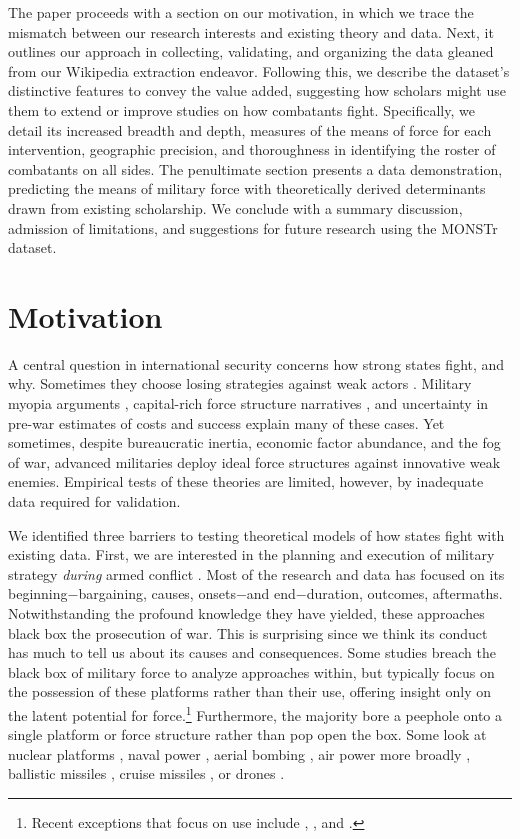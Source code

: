 \documentclass[fleqn,12pt]{article}
\begin{document}
The paper proceeds with a section on our motivation, in which we trace the mismatch between our research interests and existing theory and data. Next, it outlines our approach in collecting, validating, and organizing the data gleaned from our Wikipedia extraction endeavor. Following this, we describe the dataset's distinctive features to convey the value added, suggesting how scholars might use them to extend or improve studies on how combatants fight. Specifically, we detail its increased breadth and depth, measures of the means of force for each intervention, geographic precision, and thoroughness in identifying the roster of combatants on all sides. The penultimate section presents a data demonstration, predicting the means of military force with theoretically derived determinants drawn from existing scholarship. We conclude with a summary discussion, admission of limitations, and suggestions for future research using the MONSTr dataset.

\section*{Motivation}
A central question in international security concerns how strong states fight, and why. Sometimes they choose losing strategies against weak actors \citep{Arreguin01}. Military myopia arguments \citep{Gentry02, LyallWilson09}, capital-rich force structure narratives \citep{Gartzke01, Caverley09}, and uncertainty in pre-war estimates of costs and success \citep{Sullivan07} explain many of these cases. Yet sometimes, despite bureaucratic inertia, economic factor abundance, and the fog of war, advanced militaries deploy ideal force structures against innovative weak enemies. Empirical tests of these theories are limited, however, by inadequate data required for validation. 

We identified three barriers to testing theoretical models of how states fight with existing data. First, we are interested in the planning and execution of military strategy \textit{during} armed conflict \citep{Wallace08}. Most of the research and data has focused on its beginning$-$bargaining, causes, onsets$-$and end$-$duration, outcomes, aftermaths. Notwithstanding the profound knowledge they have yielded, these approaches black box the prosecution of war. This is surprising since we think its conduct has much to tell us about its causes and consequences. Some studies breach the black box of military force to analyze approaches within, but typically focus on the possession of these platforms rather than their use, offering insight only on the latent potential for force.\footnote{Recent exceptions that focus on use include \citet{MM15}, \citet{Post19}, and \citet{Gannon22}.} Furthermore, the majority bore a peephole onto a single platform or force structure rather than pop open the box. Some look at nuclear platforms \citep{Gartzke14}, naval power \citep{CrisherSouva14}, aerial bombing \citep{Pape96}, air power more broadly \citep{HorowitzReiter01, MM15, AllenMM17}, ballistic missiles \citep{ReiterMettler13}, cruise missiles \citep{Early22}, or drones \citep{FuhrmannHorowitz17}.
\end{document}
